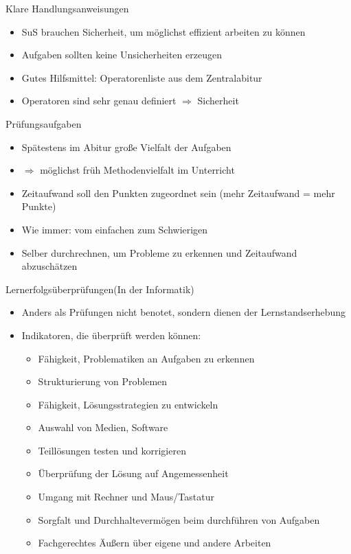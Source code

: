 \documentclass{article}
\begin{document}
\begin{block}{Klare Handlungsanweisungen}
    \begin{itemize}
        \item SuS brauchen Sicherheit, um möglichst effizient arbeiten zu können
        \item Aufgaben sollten keine Unsicherheiten erzeugen
        \item Gutes Hilfsmittel: Operatorenliste aus dem Zentralabitur
        \item Operatoren sind sehr genau definiert $\Rightarrow$ Sicherheit
    \end{itemize}
\end{block}

\begin{block}{Prüfungsaufgaben}
    \begin{itemize}
        \item Spätestens im Abitur große Vielfalt der Aufgaben
        \item $\Rightarrow$ möglichst früh Methodenvielfalt im Unterricht
        \item Zeitaufwand soll den Punkten zugeordnet sein (mehr Zeitaufwand = mehr Punkte)
        \item Wie immer: vom einfachen zum Schwierigen
        \item Selber durchrechnen, um Probleme zu erkennen und Zeitaufwand abzuschätzen
    \end{itemize}
\end{block}

\begin{block}{Lernerfolgsüberprüfungen(In der Informatik)}
    \begin{itemize}
        \item Anders als Prüfungen nicht benotet, sondern dienen der Lernstandserhebung
        \item Indikatoren, die überprüft werden können:
        \begin{itemize}
            \item Fähigkeit, Problematiken an Aufgaben zu erkennen
            \item Strukturierung von Problemen
            \item Fähigkeit, Lösungsstrategien zu entwickeln
            \item Auswahl von Medien, Software
            \item Teillösungen testen und korrigieren
            \item Überprüfung der Lösung auf Angemessenheit
            \item Umgang mit Rechner und Maus/Tastatur
            \item Sorgfalt und Durchhaltevermögen beim durchführen von Aufgaben
            \item Fachgerechtes Äußern über eigene und andere Arbeiten
        \end{itemize}
    \end{itemize}
\end{block}
\end{document}
